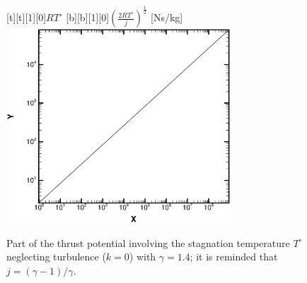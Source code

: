 \documentclass{warpdoc}
\numberwithin{equation}{section}
\begin{document}
%
%
\begin{figure}[ht]
 \begin{center}
   [t][t][1][0]{$RT^\circ$}
   [b][b][1][0]{$\left(\frac{2 R T^\circ}{j}\right)^\frac{1}{2}$ [Ns/kg]}
   \includegraphics[width=3.3in]{RTstag.eps}
   \caption{Part of the thrust potential involving the
            stagnation temperature $T^\circ$ neglecting turbulence ($k=0$) with
            $\gamma=1.4$; it is reminded that $j=(\gamma-1)/\gamma$.}
 \end{center}
\end{figure}
%

  
  
\end{document}
